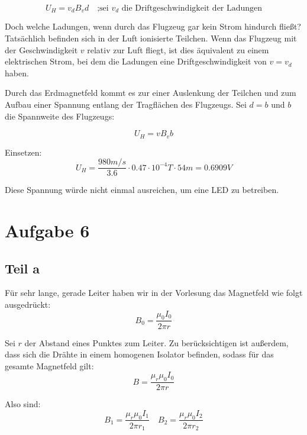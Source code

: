 \documentclass[a4paper,german,12pt,smallheadings]{scrartcl}
\begin{document}
\begin{equation*}
U_H=v_dB_vd \quad \text{;sei $v_d$ die Driftgeschwindigkeit der Ladungen}
\end{equation*}

Doch welche Ladungen, wenn durch das Flugzeug gar kein Strom hindurch
fließt? Tatsächlich befinden sich in der Luft ionisierte Teilchen. Wenn das
Flugzeug mit der Geschwindigkeit $v$ relativ zur Luft fliegt, ist dies
äquivalent zu einem elektrischen Strom, bei dem die Ladungen eine
Driftgeschwindigkeit von $v=v_d$ haben.

Durch das Erdmagnetfeld kommt es zur einer Auslenkung der Teilchen und zum
Aufbau einer Spannung entlang der Tragflächen des Flugzeugs. Sei $d=b$ und $b$
die Spannweite des Flugzeugs:

\begin{equation*}
U_H=vB_vb
\end{equation*}

Einsetzen:
\begin{equation*}
U_H=\frac{980m/s}{3.6}\cdot 0.47 \cdot 10^{-4}T \cdot 54m =0.6909V
\end{equation*}

Diese Spannung würde nicht einmal ausreichen, um eine LED zu betreiben.

\section*{Aufgabe 6}
\subsection *{Teil a}

Für sehr lange, gerade Leiter haben wir in der Vorlesung das Magnetfeld wie
folgt ausgedrückt:
\begin{equation*}
B_0=\frac{\mu_0 I_0}{2\pi r}
\end{equation*}

Sei $r$ der Abstand eines Punktes zum Leiter. Zu berücksichtigen ist außerdem,
dass sich die Drähte in einem homogenen Isolator befinden, sodass für das
gesamte Magnetfeld gilt:
\begin{equation*}
B = \frac{\mu_r \mu_0 I_0}{2\pi r}
\end{equation*}

Also sind:
\begin{equation*}
B_1 = \frac{\mu_r \mu_0 I_1}{2\pi r_1} \quad B_2 = \frac{\mu_r \mu_0 I_2}{2\pi r_2}
\end{equation*}
\end{document}
